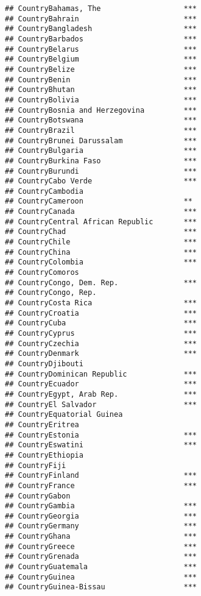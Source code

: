 \documentclass[
]{article}
\begin{document}
\begin{verbatim}
## CountryBahamas, The                   ***
## CountryBahrain                        ***
## CountryBangladesh                     ***
## CountryBarbados                       ***
## CountryBelarus                        ***
## CountryBelgium                        ***
## CountryBelize                         ***
## CountryBenin                          ***
## CountryBhutan                         ***
## CountryBolivia                        ***
## CountryBosnia and Herzegovina         ***
## CountryBotswana                       ***
## CountryBrazil                         ***
## CountryBrunei Darussalam              ***
## CountryBulgaria                       ***
## CountryBurkina Faso                   ***
## CountryBurundi                        ***
## CountryCabo Verde                     ***
## CountryCambodia                          
## CountryCameroon                       ** 
## CountryCanada                         ***
## CountryCentral African Republic       ***
## CountryChad                           ***
## CountryChile                          ***
## CountryChina                          ***
## CountryColombia                       ***
## CountryComoros                           
## CountryCongo, Dem. Rep.               ***
## CountryCongo, Rep.                       
## CountryCosta Rica                     ***
## CountryCroatia                        ***
## CountryCuba                           ***
## CountryCyprus                         ***
## CountryCzechia                        ***
## CountryDenmark                        ***
## CountryDjibouti                          
## CountryDominican Republic             ***
## CountryEcuador                        ***
## CountryEgypt, Arab Rep.               ***
## CountryEl Salvador                    ***
## CountryEquatorial Guinea                 
## CountryEritrea                           
## CountryEstonia                        ***
## CountryEswatini                       ***
## CountryEthiopia                          
## CountryFiji                              
## CountryFinland                        ***
## CountryFrance                         ***
## CountryGabon                             
## CountryGambia                         ***
## CountryGeorgia                        ***
## CountryGermany                        ***
## CountryGhana                          ***
## CountryGreece                         ***
## CountryGrenada                        ***
## CountryGuatemala                      ***
## CountryGuinea                         ***
## CountryGuinea-Bissau                  ***

\end{verbatim}
\end{document}

